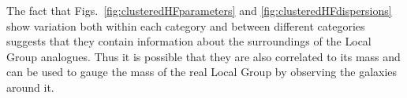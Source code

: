 \documentclass[english, oneside]{HYgradu}
\begin{document}
The fact that Figs.~\ref{fig:clusteredHFparameters} and \ref{fig:clusteredHFdispersions} show variation both within each category and between different categories suggests that they contain information about the surroundings of the Local Group analogues. Thus it is possible that they are also correlated to its mass and can be used to gauge the mass of the real Local Group by observing the galaxies around it.






%
%
%
\end{document}
